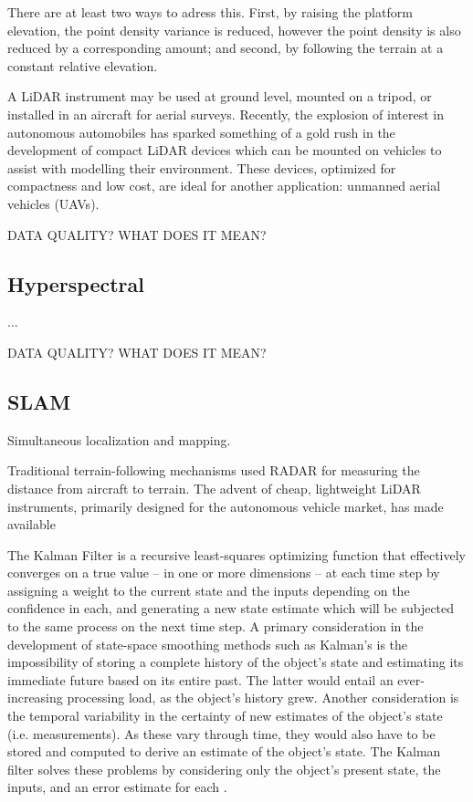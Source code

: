 \documentclass[10pt,a4paper]{report}
\begin{document}
There are at least two ways to adress this. First, by raising the platform elevation, the point density variance is reduced, however the point density is also reduced by a corresponding amount; and second, by following the terrain at a constant relative elevation.

A LiDAR instrument may be used at ground level, mounted on a tripod, or installed in an aircraft for aerial surveys. Recently, the explosion of interest in autonomous automobiles has sparked something of a gold rush in the development of compact LiDAR devices which can be mounted on vehicles to assist with modelling their environment. These devices, optimized for compactness and low cost, are ideal for another application: unmanned aerial vehicles (UAVs).

DATA QUALITY? WHAT DOES IT MEAN?


\subsection{Hyperspectral}

...


DATA QUALITY? WHAT DOES IT MEAN?


\subsection{SLAM}

Simultaneous localization and mapping.

Traditional terrain-following mechanisms used RADAR for measuring the distance from aircraft to terrain. The advent of cheap, lightweight LiDAR instruments, primarily designed for the autonomous vehicle market, has made available 


The Kalman Filter \cite{Kalman1960} is a recursive least-squares optimizing function that effectively converges on a true value -- in one or more dimensions -- at each time step by assigning a weight to the current state and the inputs depending on the confidence in each, and generating a new state estimate which will be subjected to the same process on the next time step. A primary consideration in the development of state-space smoothing methods such as Kalman's is the impossibility of storing a complete history of the object's state and estimating its immediate future based on its entire past. The latter would entail an ever-increasing processing load, as the object's history grew. Another consideration is the temporal variability in the certainty of new estimates of the object's state (i.e. measurements). As these vary through time, they would also have to be stored and computed to derive an estimate of the object's state. The Kalman filter solves these problems by considering only the object's present state, the inputs, and an error estimate for each \cite{Swerling1959}. 
\end{document}
